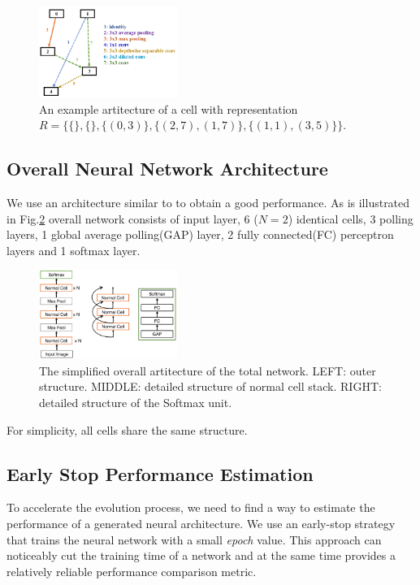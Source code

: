 \documentclass[conference]{IEEEtran}
\begin{document}
\begin{figure}[H]
   \centering
   \includegraphics[width=0.4\textwidth]{figures/cellStruct.png}
 \caption{An example artitecture of a cell with representation $R=\{\{\},\{\},\{(0,3)\},\{(2,7),(1,7)\},\{(1,1),(3,5)\}\}$.}\label{fig:digit}
 \label{f_artc}
\end{figure}

\subsection{Overall Neural Network Architecture}
We use an architecture similar to \cite{He_2016_CVPR} to obtain a good performance. As is illustrated in Fig.\ref{total_artc} overall network consists of input layer, 6 ($N = 2$) identical cells, 3 polling layers, 1 global average polling(GAP) layer, 2 fully connected(FC) perceptron layers and 1 softmax layer. 

\begin{figure}[H]
   \centering
   \includegraphics[width=0.4\textwidth]{figures/overallStruct.png}
 \caption{The simplified overall artitecture of the total network. LEFT: outer structure. MIDDLE: detailed structure of normal cell stack. RIGHT: detailed structure of the Softmax unit.}\label{fig:digit}
 \label{total_artc}
\end{figure}

For simplicity, all cells share the same structure.



\subsection{Early Stop Performance Estimation}

To accelerate the evolution process, we need to find a way to estimate the performance of a generated neural architecture. We use an early-stop strategy that trains the neural network with a small \emph{epoch} value. This approach can noticeably cut the training time of a network and at the same time provides a relatively reliable performance comparison metric.
\end{document}
